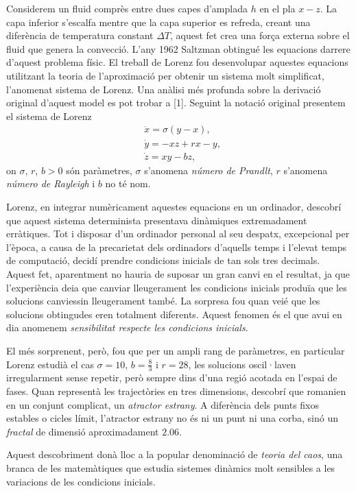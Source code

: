 \documentclass[11pt,a4paper,openright,oneside]{article}
\numberwithin{equation}{section}
\theoremstyle{definition}
\begin{document}
Considerem un fluid comprès entre dues capes d'amplada $h$ en el pla $x-z$. 
La capa inferior s'escalfa mentre que la capa superior es refreda, creant una diferència de temperatura constant $\Delta T$, aquest fet crea una força externa sobre el fluid que genera la convecció. L'any 1962 Saltzman obtingué les equacions darrere d'aquest problema físic. El treball de Lorenz fou desenvolupar aquestes equacions utilitzant la teoria de l'aproximació per obtenir un sistema molt simplificat, l'anomenat sistema de Lorenz. Una anàlisi més profunda sobre la derivació original d'aquest model es pot trobar a [1]. Seguint la notació original presentem el sistema de Lorenz 
\begin{align*} 
    &\dot{x}=\sigma(y-x),\\ 
    &\dot{y}=-xz+rx-y, \\
    &\dot{z}=xy-bz,
\end{align*}
on $\sigma$, $r$, $b>0$ són paràmetres, $\sigma$ s'anomena \textit{número de Prandlt}, $r$ s'anomena \textit{número de Rayleigh} i $b$ no té nom. 

Lorenz, en integrar numèricament aquestes equacions en un ordinador, descobrí que aquest sistema determinista presentava dinàmiques extremadament erràtiques. Tot i disposar d'un ordinador personal al seu despatx, excepcional per l'època, a causa de la precarietat dels ordinadors d'aquells temps i l'elevat temps de computació, decidí prendre condicions inicials de tan sols tres decimals. Aquest fet, aparentment no hauria de suposar un gran canvi en el resultat, ja que l'experiència deia que canviar lleugerament les condicions inicials produïa que les solucions canviessin lleugerament també. La sorpresa fou quan veié que les solucions obtingudes eren totalment diferents. Aquest fenomen és el que avui en dia anomenem \textit{sensibilitat respecte les condicions inicials}. 

El més sorprenent, però, fou que per un ampli rang de paràmetres, en particular Lorenz estudià el cas $\sigma=10$, $b=\frac{8}{3}$ i $r=28$, les solucions oscil·laven irregularment sense repetir, però sempre dins d'una regió acotada en l'espai de fases. Quan representà les trajectòries en tres dimensions, descobrí que romanien en un conjunt complicat, un \textit{atractor estrany}. A diferència dels punts fixos estables o cicles límit, l'atractor estrany no és ni un punt ni una corba, sinó un \textit{fractal} de dimensió aproximadament $2.06$. 

Aquest descobriment donà lloc a la popular denominació de \textit{teoria del caos}, una branca de les matemàtiques que estudia sistemes dinàmics molt sensibles a les variacions de les condicions inicials.
\end{document}
